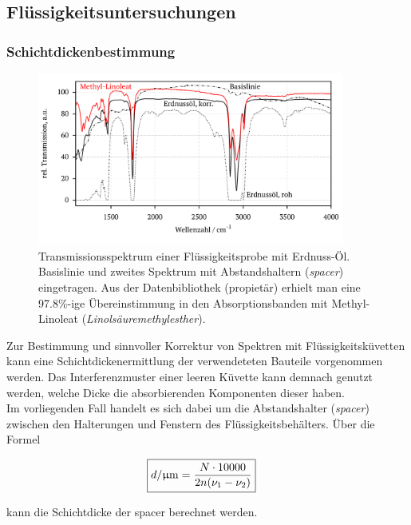\documentclass[a4paper,10pt,twocolumn]{article}
\newcommand{\ix}[1]{_\text{#1}}
\newcommand{\tilt}[1]{\textit{#1}}
\begin{document}
		\subsection{Fl\"ussigkeitsuntersuchungen}

		\subsubsection{Schichtdickenbestimmung}

			\begin{figure}
			\centering
				\includegraphics[width=0.9\textwidth]{Gruppe2A/erdnuss.pdf}
				\caption{Transmissionsspektrum einer Fl\"ussigkeitsprobe mit Erdnuss-\"Ol. Basislinie und zweites Spektrum mit Abstandshaltern (\tilt{spacer}) eingetragen. Aus der Datenbibliothek (propiet\"ar) erhielt man eine 97.8\%-ige \"Ubereinstimmung in den Absorptionsbanden mit Methyl-Linoleat (\tilt{Linols\"auremethylesther}).} 
				\label{img:erdnuss}
			\end{figure}

		Zur Bestimmung und sinnvoller Korrektur von Spektren mit Fl\"ussigkeitsk\"uvetten kann eine Schichtdickenermittlung der verwendeteten Bauteile vorgenommen werden. Das Interferenzmuster einer leeren K\"uvette kann demnach genutzt werden, welche Dicke die absorbierenden Komponenten dieser haben.\\
		Im vorliegenden Fall handelt es sich dabei um die Abstandshalter (\tilt{spacer}) zwischen den Halterungen und Fenstern des Fl\"ussigkeitsbeh\"alters. \"Uber die Formel
		
		\begin{align}
		\Aboxed{
			d/\unit{\upmu m}=\frac{N\cdot 10000}{2n(\nu\ix{1}-\nu\ix{2})}
			}
		\end{align}
		
		kann die Schichtdicke der spacer berechnet werden.
\end{document}
